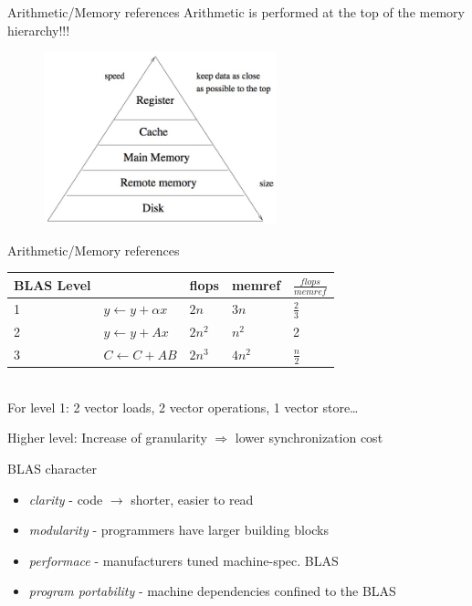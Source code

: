 	\begin{frame}{Arithmetic/Memory references}
		Arithmetic is performed at the top of the memory hierarchy!!!
		\begin{figure}
			\includegraphics[height=5cm]{img/13/arithmeticmemref}
		\end{figure}
	\end{frame}
	\begin{frame}{Arithmetic/Memory references}
		\begin{tabular}{ | l | l | l | l | l |}
		\hline
		BLAS Level & 		& flops 	&memref 	& $\frac{flops}{mem ref}$ \\ \hline
		1 & $y \leftarrow y + \alpha x$ 	& $2n$ 	& $3n$ 	& $\frac{2}{3} $ \\ \hline
		2 & $y \leftarrow y + Ax$ 		& $2n^2$ 	& $n^2$ 	& 2 			\\ \hline
		3 & $C \leftarrow C + AB$ 	& $2n^3$ 	& $4n^2$ 	& $\frac{n}{2}$ 	\\ \hline
		\end{tabular} \\

		For level 1: 2 vector loads, 2 vector operations, 1 vector store\dots

		Higher level: Increase of granularity $\Rightarrow$ lower synchronization cost
	\end{frame}
	\begin{frame}{BLAS character}
		\begin{itemize}
			\item \textit{clarity} - code $\rightarrow$ shorter, easier to read
			\item \textit{modularity} - programmers have larger building blocks
			\item \textit{performace} - manufacturers tuned machine-spec. BLAS
			\item \textit{program portability} - machine dependencies confined to the BLAS
		\end{itemize}
	\end{frame}
